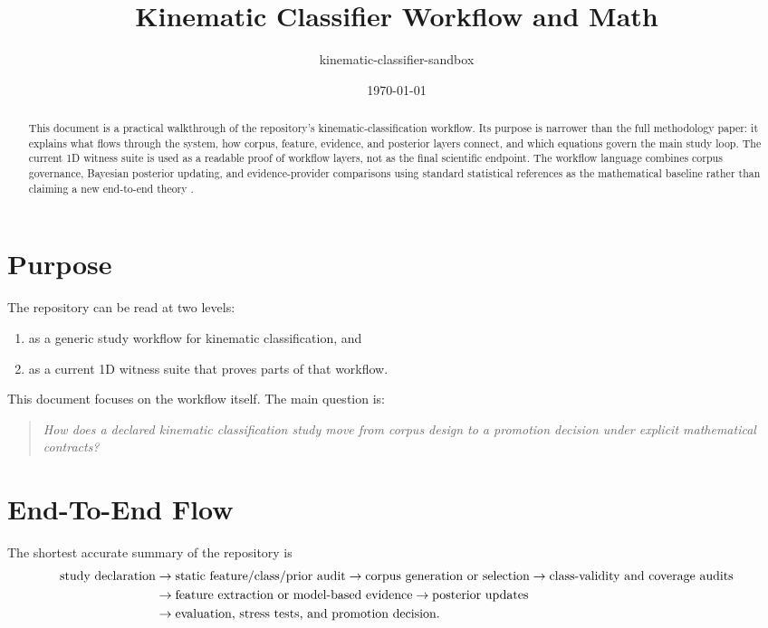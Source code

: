 \documentclass[11pt]{article}
\title{Kinematic Classifier Workflow and Math}
\author{kinematic-classifier-sandbox}
\date{\today}
\begin{document}
\maketitle

\begin{abstract}
This document is a practical walkthrough of the repository's kinematic-classification workflow. Its purpose is narrower than the full methodology paper: it explains what flows through the system, how corpus, feature, evidence, and posterior layers connect, and which equations govern the main study loop. The current 1D witness suite is used as a readable proof of workflow layers, not as the final scientific endpoint. The workflow language combines corpus governance, Bayesian posterior updating, and evidence-provider comparisons using standard statistical references as the mathematical baseline rather than claiming a new end-to-end theory \cite{bishop2006,kalman1960,brier1950}.
\end{abstract}

\section{Purpose}
The repository can be read at two levels:
\begin{enumerate}[leftmargin=1.5em]
  \item as a generic study workflow for kinematic classification, and
  \item as a current 1D witness suite that proves parts of that workflow.
\end{enumerate}

This document focuses on the workflow itself. The main question is:
\begin{quote}
\textit{How does a declared kinematic classification study move from corpus design to a promotion decision under explicit mathematical contracts?}
\end{quote}

\section{End-To-End Flow}
The shortest accurate summary of the repository is
\begin{align}
\text{study declaration}
&\rightarrow
\text{static feature/class/prior audit}
\rightarrow
\text{corpus generation or selection}
\rightarrow
\text{class-validity and coverage audits}
\notag \\
&\rightarrow
\text{feature extraction or model-based evidence}
\rightarrow
\text{posterior updates}
\notag \\
&\rightarrow
\text{evaluation, stress tests, and promotion decision}.
\end{align}
\end{document}
